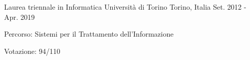 


\begin{cventries}


\cventryy
{Laurea triennale in Informatica} %
{Università di Torino} %
{Torino, Italia} %
{Set. 2012 - Apr. 2019} %
{ %
	\begin{cvitems}
		\item {Percorso: Sistemi per il Trattamento dell'Informazione}
		\item {Votazione: 94/110}
	\end{cvitems}
}




\end{cventries}

\bigbreak
